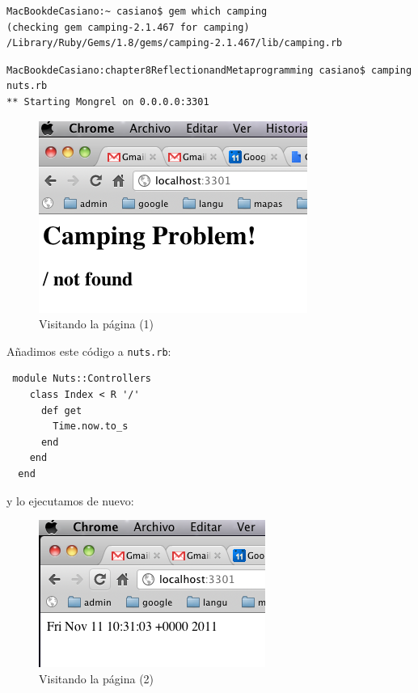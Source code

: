 \begin{verbatim}
MacBookdeCasiano:~ casiano$ gem which camping
(checking gem camping-2.1.467 for camping)
/Library/Ruby/Gems/1.8/gems/camping-2.1.467/lib/camping.rb
\end{verbatim}

\begin{verbatim}
MacBookdeCasiano:chapter8ReflectionandMetaprogramming casiano$ camping nuts.rb 
** Starting Mongrel on 0.0.0.0:3301
\end{verbatim}

\begin{figure}[htb]
\begin{center}
\includegraphics[scale=0.5]{chapter8/camping1.png}
\end{center}
\label{figure:camping1png}
\caption{Visitando la página (1)}
\end{figure}

Añadimos este código a \verb|nuts.rb|:
\begin{verbatim}
 module Nuts::Controllers
    class Index < R '/'
      def get
        Time.now.to_s
      end
    end
  end
\end{verbatim}

y lo ejecutamos de nuevo:
\begin{figure}[htb]
\begin{center}
\includegraphics[scale=0.5]{chapter8/camping2.png}
\end{center}
\label{figure:camping2png}
\caption{Visitando la página (2)}
\end{figure}


